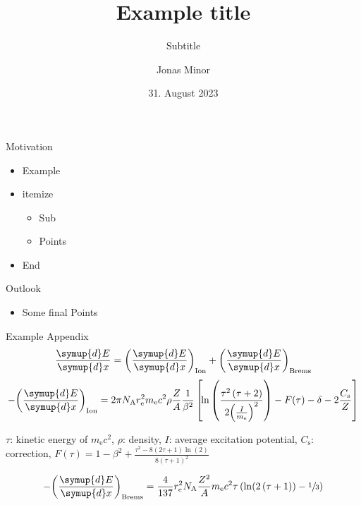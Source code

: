 \documentclass[aspectratio=1610, 17pt]{beamer}
\title{Example title} %
\subtitle{Subtitle} %
\author[J.~Minor]{Jonas Minor} %
\date{31. August 2023} %
\institute[]{Simulation Sciences} %
\newcommand{\dd}{\symup{d}}
\begin{document}
\maketitle

\begin{frame}{Motivation}
  \begin{itemize}
    \item Example
    \item itemize 
          \begin{itemize}
            \item Sub
            \item Points
          \end{itemize}
    \item End
  \end{itemize}
\end{frame}

\begin{frame}{Outlook}
  \begin{itemize}
        \item Some final Points
  \end{itemize}
  \vspace{0cm}
\end{frame}

\begin{frame}
  \centering
  \Huge{}
\end{frame}

\printappxnotes

\begin{frame}{Example Appendix}
  \vspace{-1ex}
  \small
  \begin{equation*}
    \frac{\dd E}{\dd x} = {\left(\frac{\dd E}{\dd x}\right)}_\text{Ion} + {\left(\frac{\dd E}{\dd x}\right)}_\text{Brems}
  \end{equation*}
  \begin{equation*}
    - {\left(\frac{\dd E}{\dd x}\right)}_\text{Ion} = 2 \pi N_\text{A} r_\text{e}^2 m_\text{e} c^2 \rho \frac{Z}{A} \frac{1}{\beta^2} \left[ \!\ln \left(\frac{\tau^2 \left(\tau + 2\right)}{2 {\left(\frac{I}{m_\text{e}}\right)}^2}\right) - F \!\left(\tau\right) - \delta - 2\frac{C_\text{s}}{Z} \right]
  \end{equation*}
  \begin{center}
    \vspace{-0em}
    \footnotesize
    $\tau$: kinetic energy of $m_\text{e} c^2$, $\rho$: density, $I$: average excitation potential, $C_\text{s}$: correction, $F(\tau) = 1 - \beta^2 + \frac{\tau^2 - 8 \left(2 \tau + 1\right) \ln \left(2\right)}{8 {\left(\tau + 1\right)}^2}$
  \end{center}
  \begin{equation*}
    - {\left(\frac{\dd E}{\dd x}\right)}_\text{Brems} = \frac{4}{137} r_\text{e}^2 N_\text{A} \frac{Z^2}{A} m_\text{e} c^2 \tau \left(\ln \!\left(2 \left(\tau + 1\right)\right) - \sfrac{1}{3}\right)
  \end{equation*}
\end{frame}
\end{document}
